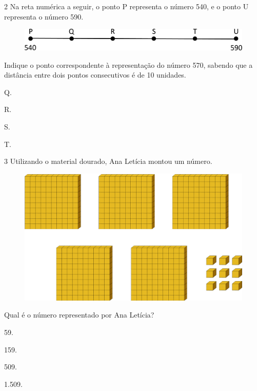 \pagebreak

\num{2} Na reta numérica a seguir, o ponto P representa o número 540, e o ponto U representa o número 590.

\begin{figure}[htpb!]
\centering
\includegraphics[width=\textwidth]{./media/image8.png}
\end{figure}

Indique o ponto correspondente à representação do número 570, sabendo que a
distância entre dois pontos consecutivos é de 10 unidades.

\begin{escolha}
  \begin{multicols}{2}
\item
  Q.
\item
  R.
\item
  S.
\item
  T.
  \end{multicols}
\end{escolha}

\num{3} Utilizando o material dourado, Ana Letícia montou um número.

\begin{figure}[htpb!]
\centering
\includegraphics[width=\textwidth]{./media/image9.png}
\end{figure}

Qual é o número representado por Ana Letícia? 

\begin{escolha}
  \begin{multicols}{2}
\item
  59.
\item
  159.
\item
  509.
\item
  1.509.
  \end{multicols}
\end{escolha}

